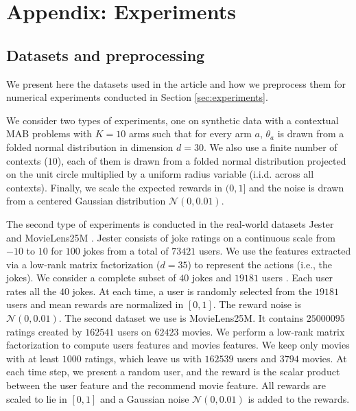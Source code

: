 \section{Appendix: Experiments}

\subsection{Datasets and preprocessing}\label{app:experiments_setup}

We present here the datasets used in the article and how we preprocess them for numerical experiments conducted in Section \ref{sec:experiments}.

We consider two types of experiments, one on synthetic data with a contextual MAB problems with $K = 10$ arms such that for every arm $a$, $\theta_{a}$ is drawn from a folded normal distribution in dimension $d = 30$. We also use a finite number of contexts ($10$), each of them is drawn from a folded normal distribution projected on the unit circle multiplied by a uniform radius variable (i.i.d. across all contexts). Finally, we scale the expected rewards in $(0,1]$ and the noise is drawn from a centered Gaussian distribution $\mathcal{N}(0, 0.01)$. 

The second type of experiments is conducted in the real-world datasets Jester \cite{goldberg2001eigentaste} and MovieLens25M \cite{harper2015movielens}. Jester consists of joke ratings on a continuous scale from $-10$ to $10$ for $100$ jokes from a total of $73421$ users. We use the features extracted via a low-rank matrix factorization ($d = 35$) to represent the actions (i.e., the jokes). We consider a complete subset of $40$ jokes and $19181$ users . Each user  rates all the $40$ jokes. At each time, a user is randomly selected from the $19181$ users and mean rewards are normalized in $[0, 1]$. The reward noise is $\mathcal{N} (0, 0.01)$. The second dataset we use is MovieLens25M. It contains $25000095$ ratings created by $162541$ users on $62423$ movies. We perform a low-rank matrix factorization to compute users features and movies features. We keep only movies with at least $1000$ ratings, which leave us with $162539$ users and $3794$ movies. At each time step, we present a random user, and the reward is the scalar product between the user feature and the recommend movie feature. All rewards are scaled to lie in $[0,1]$ and a Gaussian noise $\mathcal{N}(0, 0.01)$ is added to the rewards. 


